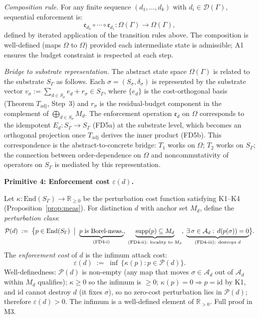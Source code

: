 \documentclass[11pt]{article}
\theoremstyle{remark}
\begin{document}
\begin{tcolorbox}[defbox, title={$\mathrm{FD4}$ (State Space and Enforcement Cost)}]
\smallskip\noindent\textit{Composition rule.}  For any finite sequence $(d_1, \ldots, d_k)$ with $d_i \in \mathcal{D}(\Gamma)$, sequential enforcement is:
\[
\mathfrak{e}_{d_k} \circ \cdots \circ \mathfrak{e}_{d_1} : \Omega(\Gamma) \to \Omega(\Gamma),
\]
defined by iterated application of the transition rules above.  The composition is well-defined (maps $\Omega$ to $\Omega$) provided each intermediate state is admissible; A1 ensures the budget constraint is respected at each step.

\smallskip\noindent\textit{Bridge to substrate representation.}  The abstract state space $\Omega(\Gamma)$ is related to the substrate $S_\Gamma$ as follows.  Each $\sigma = (S_\sigma, \delta_\sigma)$ is represented by the substrate vector $v_\sigma := \sum_{d \in S_\sigma} e_d + r_\sigma \in S_\Gamma$, where $\{e_d\}$ is the cost-orthogonal basis (Theorem $T_{\mathrm{adj}}$, Step~3) and $r_\sigma$ is the residual-budget component in the complement of $\bigoplus_{d \in S_\sigma} M_d$.  The enforcement operation $\mathfrak{e}_d$ on $\Omega$ corresponds to the idempotent $E_d: S_\Gamma \to S_\Gamma$ (FD5a) at the substrate level, which becomes an orthogonal projection once $T_{\mathrm{adj}}$ derives the inner product (FD5b).  This correspondence is the abstract-to-concrete bridge: $T_1$ works on $\Omega$; $T_2$ works on $S_\Gamma$; the connection between order-dependence on $\Omega$ and noncommutativity of operators on $S_\Gamma$ is mediated by this representation.



\noindent\textbf{Primitive 4: Enforcement cost $\varepsilon(d)$.}

Let $\kappa: \mathrm{End}(S_\Gamma) \to \mathbb{R}_{\ge 0}$ be the perturbation cost function satisfying K1--K4 (Proposition~\ref{prop:meas}).  For distinction $d$ with anchor set $M_d$, define the \emph{perturbation class}:
\[
\mathcal{P}(d) \;:=\; \bigl\{ p \in \mathrm{End}(S_\Gamma) \;\bigm|\; \underbrace{p \text{ is Borel-meas.}}_{\text{(FD4-i)}},\; \underbrace{\mathrm{supp}(p) \subseteq M_d}_{\text{(FD4-ii): locality to }M_d},\; \underbrace{\exists\,\sigma \in \mathcal{A}_d:\, d(p(\sigma)) = 0}_{\text{(FD4-iii): destroys }d} \bigr\}.
\]
The \emph{enforcement cost} of $d$ is the infimum attack cost:
\[
\varepsilon(d) \;:=\; \inf\,\bigl\{\kappa(p) : p \in \mathcal{P}(d)\bigr\}.
\]
Well-definedness: $\mathcal{P}(d)$ is non-empty (any map that moves $\sigma \in \mathcal{A}_d$ out of $\mathcal{A}_d$ within $M_d$ qualifies); $\kappa \ge 0$ so the infimum is $\ge 0$; $\kappa(p) = 0 \Rightarrow p = \mathrm{id}$ by K1, and $\mathrm{id}$ cannot destroy $d$ (it fixes $\sigma$), so no zero-cost perturbation lies in $\mathcal{P}(d)$; therefore $\varepsilon(d) > 0$.  The infimum is a well-defined element of $\mathbb{R}_{>0}$.  Full proof in M3.


\end{tcolorbox}
\end{document}
